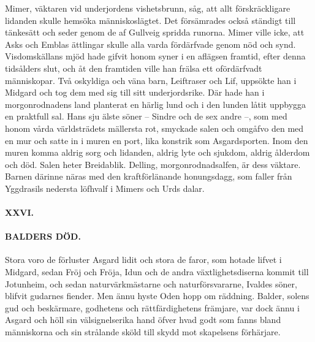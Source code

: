 Mimer, väktaren vid underjordens vishetsbrunn, såg, att allt
förskräckligare lidanden skulle hemsöka människoslägtet. Det försämrades
också ständigt till tänkesätt och seder genom de af Gullveig spridda
runorna. Mimer ville icke, att Asks och Emblas ättlingar skulle alla
varda fördärfvade genom nöd och synd. Visdomskällans mjöd hade gifvit
honom syner i en aflägsen framtid, efter denna tidsålders slut, och åt
den framtiden ville han frälsa ett ofördärfvadt människopar. Två
oskyldiga och väna barn, Leiftraser och Lif, uppsökte han i Midgard och
tog dem med sig till sitt underjordsrike. Där hade han i morgonrodnadens
land planterat en härlig lund och i den lunden låtit uppbygga en
praktfull sal. Hans sju älste söner -- Sindre och de sex andre --, som
med honom vårda världsträdets mällersta rot, smyckade salen och omgåfvo
den med en mur och satte in i muren en port, lika konstrik som
Asgardsporten. Inom den muren komma aldrig sorg och lidanden, aldrig
lyte och sjukdom, aldrig ålderdom och död. Salen heter Breidablik.
Delling,
morgonrodnadsalfen\protect\hypertarget{lb1625905.xhtmlux5cux23start84}{}{}\protect\hypertarget{lb1625905.xhtmlux5cux23start84-a}{}{}\protect\hypertarget{lb1625905.xhtmlux5cux23start84-b}{}{}\protect\hypertarget{lb1625905.xhtmlux5cux23start84-c}{}{}\protect\hypertarget{lb1625905.xhtmlux5cux23start84-d}{}{},
är dess väktare. Barnen därinne näras med den kraftförlänande
honungsdagg, som faller från Yggdrasils nedersta löfhvalf i Mimers och
Urds dalar.

\paragraph{XXVI.}

\paragraph{BALDERS DÖD.}

Stora voro de förluster Asgard lidit och stora de faror, som hotade
lifvet i Midgard, sedan Fröj och Fröja, Idun och de andra
växtlighetsdiserna kommit till Jotunheim, och sedan naturvärkmästarne
och naturförsvararne, Ivaldes söner, blifvit gudarnes fiender. Men ännu
hyste Oden hopp om räddning. Balder, solens gud och beskärmare,
godhetens och rättfärdighetens främjare, var dock ännu i Asgard och höll
sin välsignelserika hand öfver hvad godt som fanns bland människorna och
sin strålande sköld till skydd mot skapelsens förhärjare.

